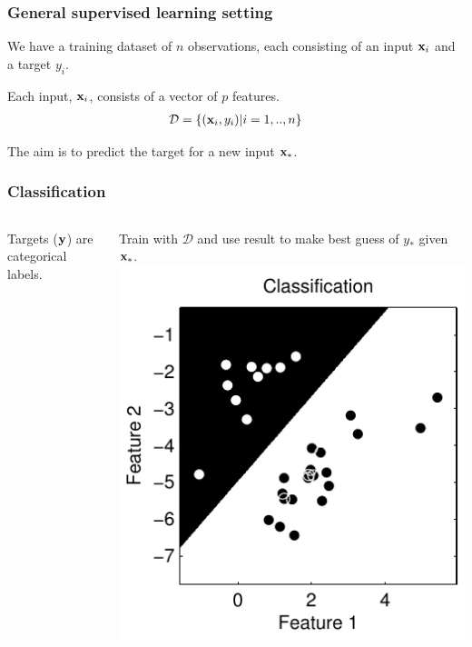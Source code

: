 \begin{frame}
\frametitle{General supervised learning setting}
We have a training dataset of $n$ observations, each consisting of an input ${\bf x}_i$ and a target $y_i$.\par
Each input, ${\bf x}_i$, consists of a vector of $p$ features.
\begin{align*}
\mathcal{D} = \{({\bf x}_i,y_i) | i=1,..,n\}
\end{align*}

The aim is to predict the target for a new input ${\bf x}_*$.
\end{frame}

\begin{frame}
\frametitle{Classification}
\begin{columns}
Targets (${\bf y}$) are categorical labels.\par
Train with $\mathcal{D}$ and use result to make best guess of $y_*$ given ${\bf x}_*$.
\includegraphics[width=\textwidth]{simple_classification}
\end{columns}
\end{frame}

